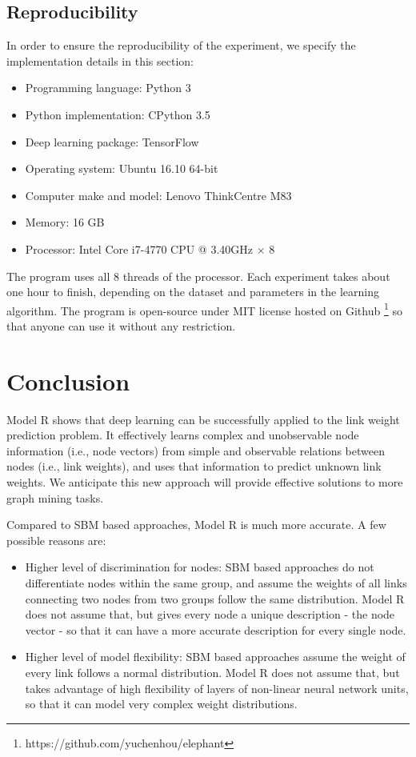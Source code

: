 \documentclass[conference]{IEEEtran}
\begin{document}
\subsection{Reproducibility}
In order to ensure the reproducibility of the experiment,
we specify the implementation details in this section:
\begin{itemize}
	\item Programming language: Python 3
	\item Python implementation: CPython 3.5
	\item Deep learning package: TensorFlow \cite{abadi2016tensorflow}
	\item Operating system: Ubuntu 16.10 64-bit
	\item Computer make and model: Lenovo ThinkCentre M83
	\item Memory: 16 GB
	\item Processor: Intel Core i7-4770 CPU @ 3.40GHz $ \times $ 8
\end{itemize}
The program uses all 8 threads of the processor.
Each experiment takes about one hour to finish,
depending on the dataset and parameters in the learning algorithm.
The program is open-source under MIT license hosted on Github \footnote{https://github.com/yuchenhou/elephant}
so that anyone can use it without any restriction.

\section{Conclusion}
Model R shows that deep learning can be successfully applied to the link weight prediction problem.
It effectively learns complex and unobservable node information (i.e., node vectors) from simple and observable relations between nodes (i.e., link weights),
and uses that information to predict unknown link weights.
We anticipate this new approach will provide effective solutions to more
graph mining tasks.

Compared to SBM based approaches, Model R is much more accurate.
A few possible reasons are:
\begin{itemize}
	\item Higher level of discrimination for nodes:
	SBM based approaches do not differentiate nodes within the same group,
	and assume the weights of all links connecting two nodes from two groups
	follow the same distribution.
	Model R does not assume that,
	but gives every node a unique description - the node vector - so that
	it can have a more accurate description for every single node.
	\item Higher level of model flexibility:
	SBM based approaches assume the weight of every link follows
	a normal distribution.
	Model R does not assume that, but takes advantage of high flexibility of
	layers of non-linear neural network units,
	so that it can model very complex weight distributions.
\end{itemize}
\end{document}

